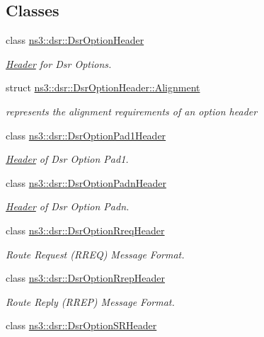 \subsection*{Classes}
\begin{DoxyCompactItemize}
\item 
class \hyperlink{classns3_1_1dsr_1_1DsrOptionHeader}{ns3\+::dsr\+::\+Dsr\+Option\+Header}
\begin{DoxyCompactList}\small\item\em \hyperlink{classns3_1_1Header}{Header} for Dsr Options. \end{DoxyCompactList}\item 
struct \hyperlink{structns3_1_1dsr_1_1DsrOptionHeader_1_1Alignment}{ns3\+::dsr\+::\+Dsr\+Option\+Header\+::\+Alignment}
\begin{DoxyCompactList}\small\item\em represents the alignment requirements of an option header \end{DoxyCompactList}\item 
class \hyperlink{classns3_1_1dsr_1_1DsrOptionPad1Header}{ns3\+::dsr\+::\+Dsr\+Option\+Pad1\+Header}
\begin{DoxyCompactList}\small\item\em \hyperlink{classns3_1_1Header}{Header} of Dsr Option Pad1. \end{DoxyCompactList}\item 
class \hyperlink{classns3_1_1dsr_1_1DsrOptionPadnHeader}{ns3\+::dsr\+::\+Dsr\+Option\+Padn\+Header}
\begin{DoxyCompactList}\small\item\em \hyperlink{classns3_1_1Header}{Header} of Dsr Option Padn. \end{DoxyCompactList}\item 
class \hyperlink{classns3_1_1dsr_1_1DsrOptionRreqHeader}{ns3\+::dsr\+::\+Dsr\+Option\+Rreq\+Header}
\begin{DoxyCompactList}\small\item\em Route Request (R\+R\+EQ) Message Format. \end{DoxyCompactList}\item 
class \hyperlink{classns3_1_1dsr_1_1DsrOptionRrepHeader}{ns3\+::dsr\+::\+Dsr\+Option\+Rrep\+Header}
\begin{DoxyCompactList}\small\item\em Route Reply (R\+R\+EP) Message Format. \end{DoxyCompactList}\item 
class \hyperlink{classns3_1_1dsr_1_1DsrOptionSRHeader}{ns3\+::dsr\+::\+Dsr\+Option\+S\+R\+Header}

\end{DoxyCompactItemize}
